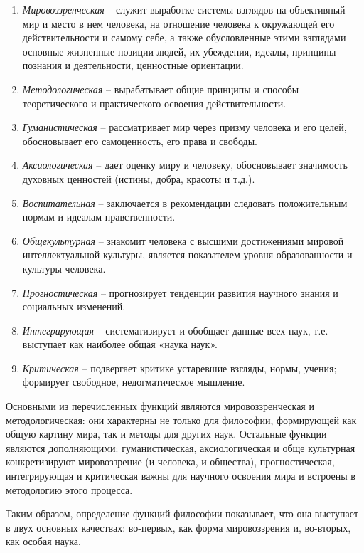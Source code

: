 \documentclass[
]{article}
\providecommand{\tightlist}{%
  \setlength{\itemsep}{0pt}\setlength{\parskip}{0pt}}
\begin{document}
\begin{enumerate}
\def\labelenumi{\arabic{enumi}.}
\tightlist
\item
  \emph{Мировоззренческая} -- служит выработке системы взглядов на
  объективный мир и место в нем человека, на отношение человека к
  окружающей его действительности и самому себе, а также обусловленные
  этими взглядами основные жизненные позиции людей, их убеждения,
  идеалы, принципы познания и деятельности, ценностные ориентации.
\item
  \emph{Методологическая} -- вырабатывает общие принципы и способы
  теоретического и практического освоения действительности.
\item
  \emph{Гуманистическая} -- рассматривает мир через призму человека и
  его целей, обосновывает его самоценность, его права и свободы.
\item
  \emph{Аксиологическая} -- дает оценку миру и человеку, обосновывает
  значимость духовных ценностей (истины, добра, красоты и т.д.).
\item
  \emph{Воспитательная} -- заключается в рекомендации следовать
  положительным нормам и идеалам нравственности.
\item
  \emph{Общекультурная} -- знакомит человека с высшими достижениями
  мировой интеллектуальной культуры, является показателем уровня
  образованности и культуры человека.
\item
  \emph{Прогностическая} -- прогнозирует тенденции развития научного
  знания и социальных изменений.
\item
  \emph{Интегрирующая} -- систематизирует и обобщает данные всех наук,
  т.е. выступает как наиболее общая «наука наук».
\item
  \emph{Критическая} -- подвергает критике устаревшие взгляды, нормы,
  учения; формирует свободное, недогматическое мышление.
\end{enumerate}

Основными из перечисленных функций являются мировоззренческая и
методологическая: они характерны не только для философии, формирующей
как общую картину мира, так и методы для других наук. Остальные функции
являются дополняющими: гуманистическая, аксиологическая и обще
культурная конкретизируют мировоззрение (и человека, и общества),
прогностическая, интегрирующая и критическая важны для научного освоения
мира и встроены в методологию этого процесса.

Таким образом, определение функций философии показывает, что она
выступает в двух основных качествах: во-первых, как форма мировоззрения
и, во-вторых, как особая наука.
\end{document}
